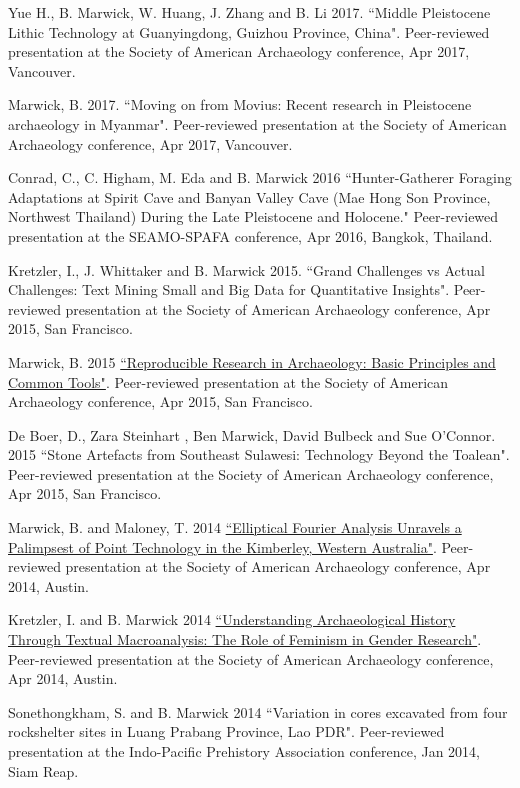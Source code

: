 \ind  Yue H., B. Marwick, W. Huang, J. Zhang and B. Li  2017. ``Middle Pleistocene Lithic Technology at Guanyingdong, Guizhou Province, China".  Peer-reviewed presentation at the Society of American Archaeology conference, Apr 2017, Vancouver.

\ind  Marwick, B. 2017. ``Moving on from Movius: Recent research in Pleistocene archaeology in Myanmar".  Peer-reviewed presentation at the Society of American Archaeology conference, Apr 2017, Vancouver.

\ind Conrad, C., C. Higham, M. Eda and B. Marwick 2016 ``Hunter-Gatherer Foraging Adaptations at Spirit Cave and Banyan Valley Cave (Mae Hong Son Province, Northwest Thailand) During the Late Pleistocene and Holocene." Peer-reviewed presentation at the SEAMO-SPAFA conference, Apr 2016, Bangkok, Thailand.

\ind Kretzler, I., J. Whittaker and B. Marwick 2015. ``Grand Challenges vs Actual Challenges: Text Mining Small and Big Data for Quantitative Insights".  Peer-reviewed presentation at the Society of American Archaeology conference, Apr 2015, San Francisco.

\ind Marwick, B. 2015 {\href{https://github.com/benmarwick/SAA2015-Open-Methods}{``Reproducible Research in Archaeology: Basic Principles and Common Tools"}}. Peer-reviewed presentation at the Society of American Archaeology conference, Apr 2015, San Francisco.

\ind De Boer, D., Zara Steinhart , Ben Marwick, David Bulbeck and Sue O'Connor. 2015 ``Stone Artefacts from Southeast Sulawesi: Technology Beyond the Toalean". Peer-reviewed presentation at the Society of American Archaeology conference, Apr 2015, San Francisco.

\ind Marwick, B. and Maloney, T. 2014 {\href{https://github.com/benmarwick/marwick-and-maloney-saa2014}{``Elliptical Fourier Analysis Unravels a Palimpsest of Point Technology  in the Kimberley, Western Australia"}}. Peer-reviewed presentation at the Society of American Archaeology conference, Apr 2014, Austin.

\ind Kretzler, I. and B. Marwick 2014 {\href{https://github.com/benmarwick/kretzler-and-marwick-saa2014}{``Understanding Archaeological History Through Textual Macroanalysis: The Role of Feminism in Gender Research"}}. Peer-reviewed presentation at the Society of American Archaeology conference, Apr 2014, Austin.

\ind Sonethongkham, S. and B. Marwick 2014 ``Variation in cores excavated from four rockshelter sites in Luang Prabang Province, Lao PDR". Peer-reviewed presentation at the Indo-Pacific Prehistory Association conference, Jan 2014, Siam Reap.

